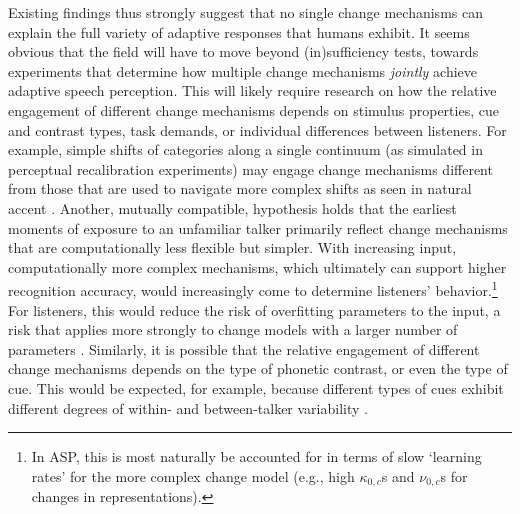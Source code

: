 \documentclass[
  11pt,
  man,floatsintext]{apa6}
\begin{document}
Existing findings thus strongly suggest that no single change mechanisms can explain the full variety of adaptive responses that humans exhibit. It seems obvious that the field will have to move beyond (in)sufficiency tests, towards experiments that determine how multiple change mechanisms \emph{jointly} achieve adaptive speech perception. This will likely require research on how the relative engagement of different change mechanisms depends on stimulus properties, cue and contrast types, task demands, or individual differences between listeners. For example, simple shifts of categories along a single continuum (as simulated in perceptual recalibration experiments) may engage change mechanisms different from those that are used to navigate more complex shifts as seen in natural accent \autocites[for discussion, see][]{bent-baeseberk2021,samuel-kraljic2009,zheng-samuel2020}. Another, mutually compatible, hypothesis holds that the earliest moments of exposure to an unfamiliar talker primarily reflect change mechanisms that are computationally less flexible but simpler. With increasing input, computationally more complex mechanisms, which ultimately can support higher recognition accuracy, would increasingly come to determine listeners' behavior.\footnote{In ASP, this is most naturally be accounted for in terms of slow `learning rates' for the more complex change model (e.g., high \(\kappa_{0,c}\)s and \(\nu_{0,c}\)s for changes in representations).} For listeners, this would reduce the risk of overfitting parameters to the input, a risk that applies more strongly to change models with a larger number of parameters \autocites[for discussion, see][]{apfelbaum-mcmurray2015,kleinschmidt-jaeger2015,toscano-mcmurray2010}. Similarly, it is possible that the relative engagement of different change mechanisms depends on the type of phonetic contrast, or even the type of cue. This would be expected, for example, because different types of cues exhibit different degrees of within- and between-talker variability \autocites[see discussions in][p.~179-180]{kleinschmidt-jaeger2015}{kraljic-samuel2007,xie2021cognition}.
\end{document}
